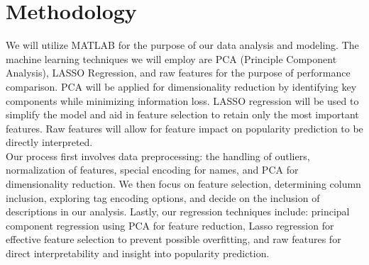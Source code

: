 \documentclass{article}
\begin{document}
\section{Methodology}

We will utilize MATLAB for the purpose of our data analysis and modeling. The machine learning techniques we will employ are PCA (Principle Component Analysis), LASSO Regression, and raw features for the purpose of performance comparison. PCA will be applied for dimensionality reduction by identifying key components while  minimizing information loss. LASSO regression will be used to simplify the model and aid in feature selection to retain only the most important features. Raw features will allow for feature impact on popularity prediction to be directly interpreted. \\
Our process first involves data preprocessing: the handling of outliers, normalization of features, special encoding for names, and PCA for dimensionality reduction. We then focus on feature selection, determining column inclusion, exploring tag encoding options, and decide on the inclusion of descriptions in our analysis. Lastly, our regression techniques include: principal component regression using PCA for feature reduction, Lasso regression for effective feature selection to prevent possible overfitting, and raw features for direct interpretability and insight into popularity prediction.







\end{document}
